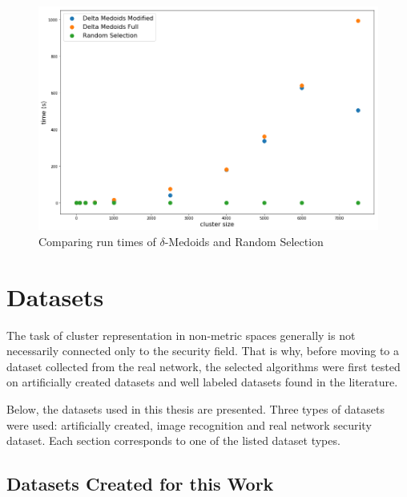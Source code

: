 \documentclass[thesis=B,english]{FITthesis}[2012/10/20]
\begin{document}
\begin{figure}
  \includegraphics[width=\linewidth]{img/complexity.png}
  \caption{Comparing run times of $\delta$-Medoids and Random Selection}
  \label{img:complexity}
\end{figure}


\chapter{Datasets}\label{ch:datasets}

The task of cluster representation in non-metric spaces generally is not necessarily connected only to the security field.
That is why, before moving to a dataset collected from the real network, the selected algorithms were first tested on artificially created datasets and well labeled datasets found in the literature.

Below, the datasets used in this thesis are presented.
Three types of datasets were used: artificially created, image recognition and real network security dataset.
Each section corresponds to one of the listed dataset types.

\section{Datasets Created for this Work}
\end{document}
